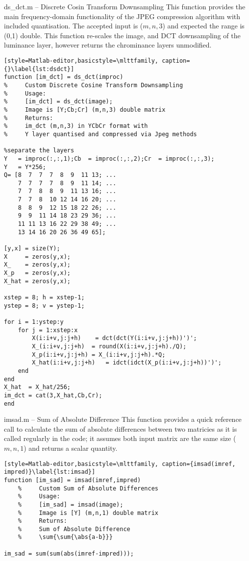 \begin{codeblock}{ds\_dct.m -- Discrete Cosin Transform Downsampling}
    This function provides the main frequency-domain functionality of the JPEG compression algorithm with included quantisation. The accepted input is ($m,n,3$) and expected the range is (0,1) double. This function re-scales the image, and DCT downsampling of the luminance layer, however returns the chrominance layers unmodified.
        
    \begin{lstlisting}[style=Matlab-editor,basicstyle=\mlttfamily, caption={}\label{lst:dsdct}]
function [im_dct] = ds_dct(improc)
%     Custom Discrete Cosine Transform Downsampling
%     Usage:
%     [im_dct] = ds_dct(image); 
%     Image is [Y;Cb;Cr] (m,n,3) double matrix
%     Returns:
%     im_dct (m,n,3) in YCbCr format with
%     Y layer quantised and compressed via Jpeg methods

%separate the layers
Y   = improc(:,:,1);Cb  = improc(:,:,2);Cr  = improc(:,:,3);
Y   = Y*256;
Q= [8  7  7  7  8  9  11 13; ...
    7  7  7  7  8  9  11 14; ...
    7  7  8  8  9  11 13 16; ...
    7  7  8  10 12 14 16 20; ...
    8  8  9  12 15 18 22 26; ...
    9  9  11 14 18 23 29 36; ...
    11 11 13 16 22 29 38 49; ...
    13 14 16 20 26 36 49 65];

[y,x] = size(Y);
X     = zeros(y,x);
X_    = zeros(y,x);
X_p   = zeros(y,x);
X_hat = zeros(y,x);

xstep = 8; h = xstep-1;
ystep = 8; v = ystep-1;

for i = 1:ystep:y
    for j = 1:xstep:x
        X(i:i+v,j:j+h)    = dct(dct(Y(i:i+v,j:j+h))')';
        X_(i:i+v,j:j+h)  = round(X(i:i+v,j:j+h)./Q);
        X_p(i:i+v,j:j+h) = X_(i:i+v,j:j+h).*Q;
        X_hat(i:i+v,j:j+h)   = idct(idct(X_p(i:i+v,j:j+h))')';
    end
end
X_hat  = X_hat/256;
im_dct = cat(3,X_hat,Cb,Cr);
end

    \end{lstlisting}
\end{codeblock}

\begin{codeblock}{imsad.m -- Sum of Absolute Difference}
    This function provides a quick reference call to calculate the sum of absolute differences between two matricies as it is called regularly in the code; it assumes both input matrix are the same size ($m,n,1$) and returns a scalar quantity.
        
    \begin{lstlisting}[style=Matlab-editor,basicstyle=\mlttfamily, caption={imsad(imref, impred)}\label{lst:imsad}]       
function [im_sad] = imsad(imref,impred)
    %     Custom Sum of Absolute Differences
    %     Usage:
    %     [im_sad] = imsad(image); 
    %     Image is [Y] (m,n,1) double matrix
    %     Returns:
    %     Sum of Absolute Difference
    %     \sum{\sum{\abs{a-b}}}

im_sad = sum(sum(abs(imref-impred))); 
\end{lstlisting}
\end{codeblock}

